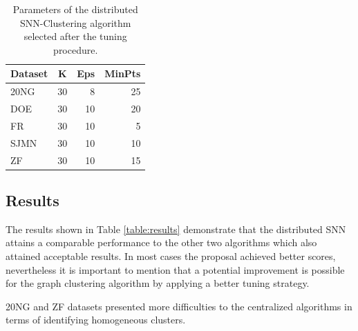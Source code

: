 \documentclass[a4paper]{article}
\begin{document}
\begin{table}[!htbp]
\centering
\begin{tabular}{l|crr}
\textbf{Dataset} & \textbf{K} & \textbf{Eps} & \textbf{MinPts} \\ \hline
20NG    & 30& 8 & 25 \\
DOE     & 30& 10& 20 \\
FR      & 30& 10& 5  \\
SJMN    & 30& 10& 10 \\
ZF      & 30& 10& 15 \\ \hline
\end{tabular}
\caption{Parameters of the distributed SNN-Clustering algorithm selected after the tuning procedure.}
\label{table:distributedsnn_params}
\end{table}


\subsection*{Results}
The results shown in Table \ref{table:results} demonstrate that the distributed SNN attains a comparable performance to the other two algorithms which also attained acceptable results. In most cases the proposal achieved better scores, nevertheless it is important to mention that a potential improvement is possible for the graph clustering algorithm by applying a better tuning strategy. 

20NG and ZF datasets presented more difficulties to the centralized algorithms in terms of identifying homogeneous clusters.


\end{document}
